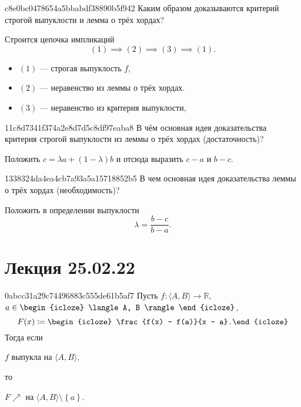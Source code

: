 \begin{note}{c8e0bc0478654a5bbabdf38890b5f942}
    Каким образом доказываются критерий строгой выпуклости и лемма о трёх хордах?

    \begin{cloze}{1}
        Строится цепочка импликаций
        \[
            (1) \implies (2) \implies (3) \implies (1).
        \]
        \begin{itemize}
            \item \({ (1) }\) --- строгая выпуклость \({ f }\),
            \item \({ (2) }\) --- неравенство из леммы о трёх хордах.
            \item \({ (3) }\) --- неравенство из критерия выпуклости,
        \end{itemize}
    \end{cloze}
\end{note}

\begin{note}{11c8d7341f374a2e8d7d5c8df97eaba8}
    В чём основная идея доказательства критерия строгой выпуклости из леммы о трёх хордах (достаточность)?

    \begin{cloze}{1}
        Положить \({ c = \lambda a + (1 - \lambda) b }\) и отсюда выразить \({ c - a }\) и \({ b - c }\).
    \end{cloze}
\end{note}

\begin{note}{1338324da4ea4cb7a93a5a15718852b5}
    В чем основная идея доказательства леммы о трёх хордах (необходимость)?

    \begin{cloze}{1}
        Положить в определении выпуклости
        \[
            \lambda = \frac{b - c}{b - a}.
        \]
    \end{cloze}
\end{note}

\section{Лекция 25.02.22}
\begin{note}{0abcc31a29c74496883c555de61b5af7}
    Пусть \( f : \langle A, B \rangle \to \mathbb R \), \( a \in \begin{icloze}{3}\langle A, B \rangle\end{icloze} \),
    \[
        F(x) \coloneqq \begin{icloze}{4}\frac{f(x) - f(a)}{x - a}.\end{icloze}
    \]
    Тогда если \begin{icloze}{2}\( f \) выпукла на \( \langle A, B \rangle  \),\end{icloze} то
    \begin{icloze}{1}
        \begin{center}
            \( F \!\!\nearrow \) на \( \langle A, B \rangle \setminus \left\{ a \right\} \).
        \end{center}
    \end{icloze}
\end{note}

